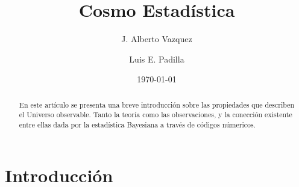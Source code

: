 \documentclass[10.5pt,prb,
               showpacs,            %
               preprintnumbers,     %
               aps,                 %
               prl,          	    %
               letterpaper,             %
               superscriptaddress,      %
               nofootinbib,         %
               tightenlines,        %
               floats,floatfix      %
               ,usenatbib]{revtex4-1}%
\begin{document}
\title{Cosmo Estad\'istica} 

\author{J. Alberto Vazquez}

\author{Luis E. Padilla}




\date{\today}

\begin{abstract}
 En este art\'iculo se presenta una breve introducci\'on sobre las propiedades
 que describen el Universo observable. Tanto la teor\'ia como las observaciones, y la conecci\'on existente entre
 ellas dada por la estad\'istica Bayesiana a trav\'es de c\'odigos n\'umericos. 
 \end{abstract}


\maketitle

\section{Introducci\'on}
\end{document}

